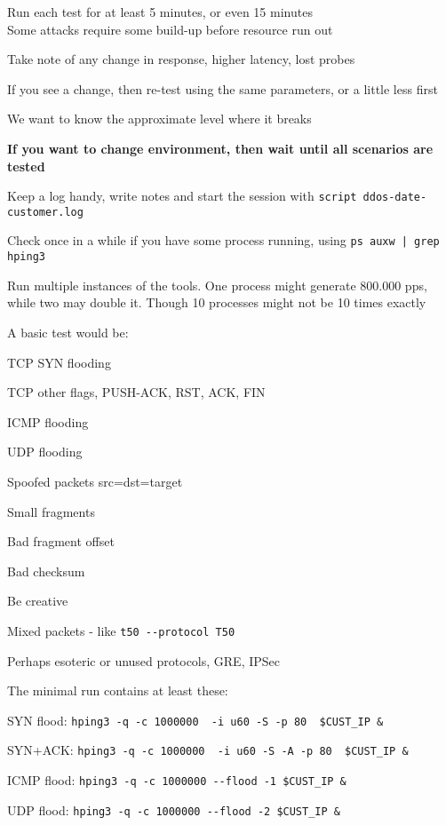 \documentclass[Screen16to9,17pt]{foils}
\begin{document}

\begin{list2}
\item Run each test for at least 5 minutes, or even 15 minutes\\
Some attacks require some build-up before resource run out
\item Take note of any change in response, higher latency, lost probes
\item If you see a change, then re-test using the same parameters, or a little less first
\item We want to know the approximate level where it breaks
\item {\bf If you want to change environment, then wait until all scenarios are tested}
\item Keep a log handy, write notes and start the session with \verb+script ddos-date-customer.log+
\item Check once in a while if you have some process running, using \verb+ps auxw | grep hping3+
\item Run multiple instances of the tools. One process might generate 800.000 pps, while two may double it. Though 10 processes might not be 10 times exactly
\end{list2}




A basic test would be:
\begin{list2}
\item TCP SYN flooding
\item TCP other flags, PUSH-ACK, RST, ACK, FIN
\item ICMP flooding
\item UDP flooding
\item Spoofed packets src=dst=target \smiley
\item Small fragments
\item Bad fragment offset
\item Bad checksum
\item Be creative
\item Mixed packets - like \verb+t50 --protocol T50+
\item Perhaps esoteric or unused protocols, GRE, IPSec
\end{list2}


The minimal run contains at least these:
\begin{list2}
\item SYN flood: \verb+hping3 -q -c 1000000  -i u60 -S -p 80  $CUST_IP &+
\item SYN+ACK: \verb+hping3 -q -c 1000000  -i u60 -S -A -p 80  $CUST_IP &+
\item ICMP flood: \verb+hping3 -q -c 1000000 --flood -1 $CUST_IP &+
\item UDP flood: \verb+hping3 -q -c 1000000 --flood -2 $CUST_IP &+
\end{list2}
\end{document}
